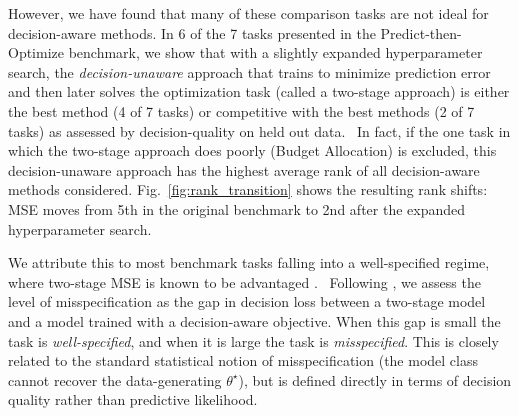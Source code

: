 


However, we have found that many of these comparison tasks are not ideal for decision-aware methods. In 6 of the 7 tasks presented in the Predict-then-Optimize benchmark, we show that with a slightly expanded hyperparameter search, the \textit{decision-unaware} approach that trains to minimize prediction error and then later solves the optimization task (called a two-stage approach) is either the best method (4 of 7 tasks) or competitive with the best methods (2 of 7 tasks) as assessed by decision-quality on held out data. \
In fact, if the one task in which the two-stage approach does poorly (Budget Allocation) is excluded, this decision-unaware approach has the highest average rank of all decision-aware methods considered. Fig.~\ref{fig:rank_transition} shows the resulting rank shifts: MSE moves from 5th in the original benchmark to 2nd after the expanded hyperparameter search.

We attribute this to most benchmark tasks falling into a well-specified regime, where two-stage MSE is known to be advantaged \citep{elmachtoubDissectingImpactModel2025, huFastRatesContextual2022}. \
Following \citet{elmachtoubDissectingImpactModel2025}, we assess the level of misspecification as the gap in decision loss between a two-stage model and a model trained with a decision-aware objective. When this gap is small the task is \emph{well-specified}, and when it is large the task is \emph{misspecified}. This is closely related to the standard statistical notion of misspecification (the model class cannot recover the data-generating $\theta^\star$), but is defined directly in terms of decision quality rather than predictive likelihood.

